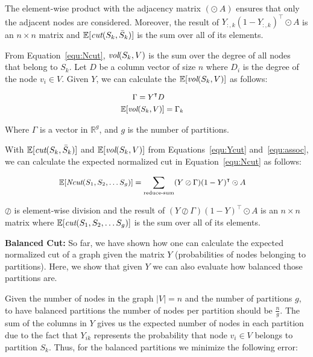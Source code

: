 \documentclass[10pt,twocolumn]{article}
\begin{document}
The element-wise product with the adjacency matrix $(\odot \ A)$ ensures that only the adjacent nodes are considered. Moreover, the result of $Y_{:,k} (1-Y_{:,k})^\intercal \odot A$ is an $n \times n$ matrix and $\mathbb{E}[\emph{cut}(S_k, \bar{S}_k)]$ is the sum over all of its elements.


From Equation~\ref{equ:Ncut}, $\emph{vol}(S_k, V)$ is the sum over the degree of all nodes that belong to $S_k$. Let $D$ be a column vector of size $n$ where $D_i$ is the degree of the node $v_i \in V$. Given $Y$, we can calculate the $\mathbb{E}[\emph{vol}(S_k, V)]$ as follows:

\begin{equation}
\label{equ:assoc}
\small
\begin{aligned}
\Gamma = Y^\intercal D \\
\mathbb{E}[\emph{vol}(S_k, V)] &= \Gamma_k
\end{aligned}
\end{equation}

Where $\Gamma$ is a vector in $\mathbb{R}^g$, and $g$ is the number of partitions. 

With $\mathbb{E}[\emph{cut}(S_k, \bar{S}_k)]$ and $\mathbb{E}[\emph{vol}(S_k, V)]$ from Equations~\ref{equ:Ycut} and~\ref{equ:assoc}, we can calculate the expected normalized cut in Equation~\ref{equ:Ncut} as follows:

\begin{equation}
\label{equ:YNcut}
\small
\begin{aligned}
\mathbb{E}[\emph{Ncut}(S_1, S_2, \dots S_g)] &= \sum_\text{reduce-sum} (Y \oslash \Gamma) (1-Y)^\intercal \odot A
\end{aligned}
\end{equation}

$\oslash$ is element-wise division and the result of $(Y \oslash \Gamma) (1-Y)^\intercal \odot A$ is an $n \times n$ matrix where $\mathbb{E}[\emph{cut}(S_1, S_2, \dots S_g)]$ is the sum over all of its elements. 

\noindent\textbf{Balanced Cut:} So far, we have shown how one can calculate the expected normalized cut of a graph given the matrix $Y$ (probabilities of nodes belonging to partitions). Here, we show that given $Y$ we can also
evaluate how balanced those partitions are.

Given the number of nodes in the graph $|V| = n$ and the number of partitions $g$, to have balanced partitions the number of nodes per partition should be $\frac{n}{g}$. The sum of the columns in $Y$ gives us the expected number of nodes in each partition due to the fact that $Y_{ik}$ represents the probability that node $v_i \in V$ belongs to partition $S_k$. Thus, for the balanced partitions we minimize the following error:
\end{document}
